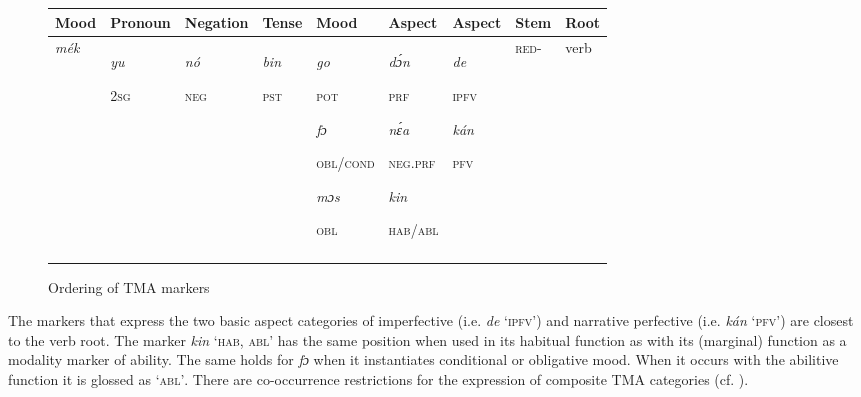 \begin{figure}
\caption{Ordering of TMA markers}
\label{fig:key:6.1}
{\footnotesize\begin{tabularx}{\textwidth}{XXXX QQQ XX}
\lsptoprule

Mood & Pronoun & Negation & Tense & Mood & Aspect & Aspect & Stem & Root\\
\midrule
{\itshape mék}

 &  \textit{yu}

\textsc{2sg} & {\itshape nó}

\textsc{neg} & {\itshape bin}

\textsc{pst} & {\itshape go}

\textsc{pot}

{\itshape fɔ}

\textsc{obl/cond}

{\itshape mɔs}

\textsc{obl} & {\itshape dɔ́n}

\textsc{prf}

{\itshape nɛ́a}

\textsc{neg}.\textsc{prf}

{\itshape kin}

\textsc{hab/abl} & {\itshape \textit{de}}

\textsc{ipfv}

{\itshape kán}

\textsc{pfv} & \textsc{red}{}- & verb\\
\lspbottomrule
\end{tabularx}}
\end{figure}

The markers that express the two basic aspect categories of imperfective (i.e. \textit{de} ‘\textsc{ipfv}’) and narrative perfective (i.e. \textit{kán} ‘\textsc{pfv}’) are closest to the verb root. The marker \textit{kin} ‘\textsc{hab,} \textsc{abl}’ has the same position when used in its habitual function as with its (marginal) function as a modality marker of ability. The same holds for \textit{fɔ} when it instantiates conditional or obligative mood. When it occurs with the abilitive function it is glossed as ‘\textsc{abl’}. There are co-occurrence restrictions for the expression of composite TMA categories (cf. ). 


